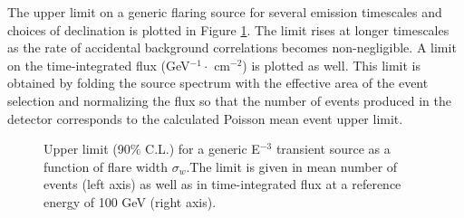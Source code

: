 \documentclass[manuscript]{aastex}
\begin{document}
The upper limit on a generic flaring source for several emission timescales and choices of declination is plotted in Figure \ref{fig:GenericE3Limit}. The limit rises at longer timescales as the rate of accidental background correlations becomes non-negligible. A limit on the time-integrated flux (GeV$^{-1} \cdot$ cm$^{-2}$) is plotted as well. This limit is obtained by folding the source spectrum with the effective area of the event selection and normalizing the flux so that the number of events produced in the detector corresponds to the calculated Poisson mean event upper limit. 

\begin{figure}[ht]
\caption[Time-integrated Flux Limit for E$^{-3}$ Source]{Upper limit (90$\%$ C.L.) for a generic E$^{-3}$ transient source as a function of flare width $\sigma_w$.The limit is given in mean number of events (left axis) as well as in time-integrated flux at a reference energy of 100 GeV (right axis).}
\label{fig:GenericE3Limit}
\end{figure}
\end{document}
